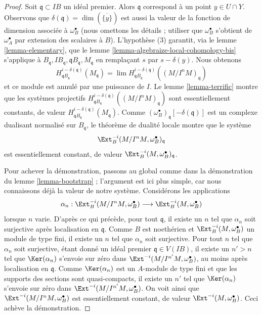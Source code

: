 \begin{proof}
\medskip\noindent
Soit $\mathfrak q \subset IB$ un idéal premier. Alors $\mathfrak q$ correspond
à un point $y \in U \cap Y$. Observons que
$\delta(\mathfrak q) = \dim(\overline{\{y\}})$
est aussi la valeur de la fonction de dimension associée à $\omega_B^\bullet$
(nous omettons les détails ; utiliser que $\omega_B^\bullet$ s'obtient de
$\omega_A^\bullet$ par extension des scalaires à $B$). L'hypothèse
(3) garantit, via le lemme \ref{lemma-elementary},
que le lemme \ref{lemma-algebraize-local-cohomology-bis}
s'applique à
$B_\mathfrak q, IB_\mathfrak q, \mathfrak qB_\mathfrak q, M_\mathfrak q$
en remplaçant $s$ par $s - \delta(y)$. Nous obtenons
$$
H^{i - \delta(\mathfrak q)}_{\mathfrak qB_\mathfrak q}(M_\mathfrak q) =
\lim H^{i - \delta(\mathfrak q)}_{\mathfrak qB_\mathfrak q}(
(M/I^nM)_\mathfrak q)
$$
et ce module est annulé par une puissance de $I$.
Le lemme \ref{lemma-terrific} montre que les systèmes projectifs
$H^{i - \delta(\mathfrak q)}_{\mathfrak qB_\mathfrak q}((M/I^nM)_\mathfrak q)$
sont essentiellement constants, de valeur
$H^{i - \delta(\mathfrak q)}_{\mathfrak qB_\mathfrak q}(M_\mathfrak q)$.
Comme $(\omega_B^\bullet)_\mathfrak q[-\delta(\mathfrak q)]$ est un complexe
dualisant normalisé sur $B_\mathfrak q$, le théorème de dualité locale
montre que le système
$$
\Ext^{-i}_B(M/I^n M, \omega_B^\bullet)_\mathfrak q
$$
est essentiellement constant, de valeur
$\Ext^{-i}_B(M, \omega_B^\bullet)_\mathfrak q$.

\medskip\noindent
Pour achever la démonstration, passons au global comme dans la démonstration du
lemme \ref{lemma-bootstrap} ; l'argument est ici plus simple,
car nous connaissons déjà la valeur de notre système. Considérons les applications
$$
\alpha_n :
\Ext^{-i}_B(M/I^n M, \omega_B^\bullet)
\longrightarrow
\Ext^{-i}_B(M, \omega_B^\bullet)
$$
lorsque $n$ varie. D'après ce qui précède, pour tout $\mathfrak q$, il existe
un $n$ tel que $\alpha_n$ soit surjective après localisation en $\mathfrak q$.
Comme $B$ est noethérien et $\Ext^{-i}_B(M, \omega_B^\bullet)$
un module de type fini, il existe un $n$ tel que $\alpha_n$ soit surjective.
Pour tout $n$ tel que $\alpha_n$ soit surjective, étant donné un idéal premier
$\mathfrak q \in V(IB)$, il existe un $n' > n$ tel que
$\Ker(\alpha_n)$ s'envoie sur zéro dans $\Ext^{-i}(M/I^{n'}M, \omega_B^\bullet)$,
au moins après localisation en $\mathfrak q$.
Comme $\Ker(\alpha_n)$ est un $A$-module de type fini et que les supports des
sections sont quasi-compacts, il existe un $n'$ tel que
$\Ker(\alpha_n)$ s'envoie sur zéro dans $\Ext^{-i}(M/I^{n'}M, \omega_B^\bullet)$.
On voit ainsi que $\Ext^{-i}(M/I^n M, \omega_B^\bullet)$
est essentiellement constant, de valeur $\Ext^{-i}(M, \omega_B^\bullet)$.
Ceci achève la démonstration.
\end{proof}

